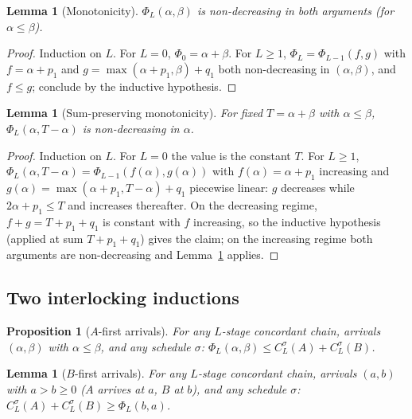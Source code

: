 \documentclass[sn-mathphys,NameDate]{sn-jnl}
\theoremstyle{thmstyleone}
\newtheorem{lemma}[theorem]{Lemma}
\newtheorem{proposition}[theorem]{Proposition}
\theoremstyle{thmstylethree}
\theoremstyle{thmstyletwo}
\begin{document}
\begin{lemma}[Monotonicity]
\label{lem:phi-mono}
$\Phi_L(\alpha, \beta)$ is non-decreasing in both arguments
\textup{(}for $\alpha \leq \beta$\textup{)}.
\end{lemma}

\begin{proof}
Induction on $L$. For $L = 0$, $\Phi_0 = \alpha + \beta$. For
$L \geq 1$, $\Phi_L = \Phi_{L-1}(f, g)$ with
$f = \alpha + p_1$ and
$g = \max(\alpha + p_1, \beta) + q_1$ both non-decreasing in
$(\alpha, \beta)$, and $f \leq g$; conclude by the inductive
hypothesis.
\end{proof}

\begin{lemma}[Sum-preserving monotonicity]
\label{lem:sum-preserving}
For fixed $T = \alpha + \beta$ with $\alpha \leq \beta$,
$\Phi_L(\alpha, T - \alpha)$ is non-decreasing in $\alpha$.
\end{lemma}

\begin{proof}
Induction on $L$. For $L = 0$ the value is the constant $T$.
For $L \geq 1$,
$\Phi_L(\alpha, T - \alpha) = \Phi_{L-1}(f(\alpha),
g(\alpha))$ with $f(\alpha) = \alpha + p_1$ increasing and
$g(\alpha) = \max(\alpha + p_1, T - \alpha) + q_1$ piecewise
linear: $g$ decreases while $2\alpha + p_1 \leq T$ and
increases thereafter. On the decreasing regime,
$f + g = T + p_1 + q_1$ is constant with $f$ increasing, so
the inductive hypothesis (applied at sum $T + p_1 + q_1$)
gives the claim; on the increasing regime both arguments are
non-decreasing and Lemma~\ref{lem:phi-mono} applies.
\end{proof}

\subsection{Two interlocking inductions}

\begin{proposition}[$A$-first arrivals]
\label{prop:Pmain}
For any $L$-stage concordant chain, arrivals
$(\alpha, \beta)$ with $\alpha \leq \beta$, and any schedule
$\sigma$:
$\Phi_L(\alpha, \beta) \leq C_L^\sigma(A) + C_L^\sigma(B)$.
\end{proposition}

\begin{lemma}[$B$-first arrivals]
\label{lem:Qsecondary}
For any $L$-stage concordant chain, arrivals $(a, b)$ with
$a > b \geq 0$ \textup{(}$A$ arrives at $a$, $B$ at
$b$\textup{)}, and any schedule $\sigma$:
$C_L^\sigma(A) + C_L^\sigma(B) \geq \Phi_L(b, a)$.
\end{lemma}
\end{document}
